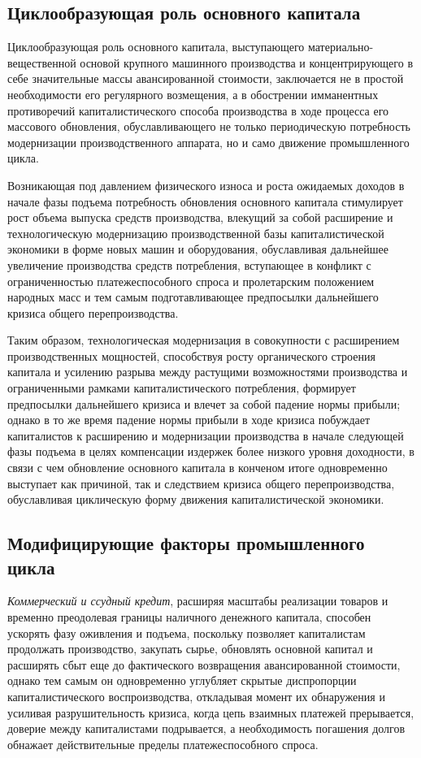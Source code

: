 \subsection{Циклообразующая роль основного капитала}
Циклообразующая роль основного капитала, выступающего материально-вещественной основой крупного машинного производства и концентрирующего в себе значительные массы авансированной стоимости, заключается не в простой необходимости его регулярного возмещения, а в обострении имманентных противоречий капиталистического способа производства в ходе процесса его массового обновления, обуславливающего не только периодическую потребность модернизации производственного аппарата, но и само движение промышленного цикла.

Возникающая под давлением физического износа и роста ожидаемых доходов в начале фазы подъема потребность обновления основного капитала стимулирует рост объема выпуска средств производства, влекущий за собой расширение и технологическую модернизацию производственной базы капиталистической экономики в форме новых машин и оборудования, обуславливая дальнейшее увеличение производства средств потребления, вступающее в конфликт с ограниченностью платежеспособного спроса и пролетарским положением народных масс и тем самым подготавливающее предпосылки дальнейшего кризиса общего перепроизводства.

Таким образом, технологическая модернизация в совокупности с расширением производственных мощностей, способствуя росту органического строения капитала и усилению разрыва между растущими возможностями производства и ограниченными рамками капиталистического потребления, формирует предпосылки дальнейшего кризиса и влечет за собой падение нормы прибыли; однако в то же время падение нормы прибыли в ходе кризиса побуждает капиталистов к расширению и модернизации производства в начале следующей фазы подъема в целях компенсации издержек более низкого уровня доходности, в связи с чем обновление основного капитала в конченом итоге одновременно выступает как причиной, так и следствием кризиса общего перепроизводства, обуславливая циклическую форму движения капиталистической экономики.

\subsection{Модифицирующие факторы промышленного цикла} %
\textit{Коммерческий и ссудный кредит}, расширяя масштабы реализации товаров и временно преодолевая границы наличного денежного капитала, способен ускорять фазу оживления и подъема, поскольку позволяет капиталистам продолжать производство, закупать сырье, обновлять основной капитал и расширять сбыт еще до фактического возвращения авансированной стоимости, однако тем самым он одновременно углубляет скрытые диспропорции капиталистического воспроизводства, откладывая момент их обнаружения и усиливая разрушительность кризиса, когда цепь взаимных платежей прерывается, доверие между капиталистами подрывается, а необходимость погашения долгов обнажает действительные пределы платежеспособного спроса.

